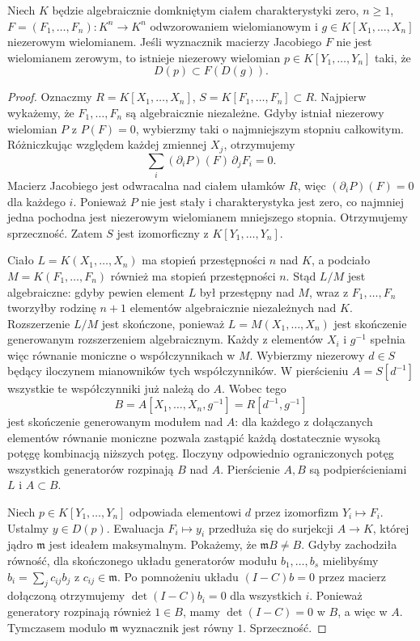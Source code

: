 \begin{lemat}
\label{aa:lem:lie-dominant-image}
Niech $K$ będzie algebraicznie domkniętym ciałem charakterystyki zero, $n\ge1$, $F=(F_1,\ldots,F_n):K^n\to K^n$ odwzorowaniem wielomianowym i $g\in K[X_1,\ldots,X_n]$ niezerowym wielomianem. Jeśli wyznacznik macierzy Jacobiego $F$ nie jest wielomianem zerowym, to istnieje niezerowy wielomian $p\in K[Y_1,\ldots,Y_n]$ taki, że
\[
 D(p)\subset F(D(g)).
\]
\end{lemat}
\begin{proof}
Oznaczmy $R=K[X_1,\ldots,X_n]$, $S=K[F_1,\ldots,F_n]\subset R$. Najpierw wykażemy, że $F_1,\ldots,F_n$ są algebraicznie niezależne. Gdyby istniał niezerowy wielomian $P$ z $P(F)=0$, wybierzmy taki o najmniejszym stopniu całkowitym. Różniczkując względem każdej zmiennej $X_j$, otrzymujemy
\[
 \sum_i (\partial_iP)(F)\,\partial_j F_i=0.
\]
Macierz Jacobiego jest odwracalna nad ciałem ułamków $R$, więc $(\partial_iP)(F)=0$ dla każdego $i$. Ponieważ $P$ nie jest stały i charakterystyka jest zero, co najmniej jedna pochodna jest niezerowym wielomianem mniejszego stopnia. Otrzymujemy sprzeczność. Zatem $S$ jest izomorficzny z $K[Y_1,\ldots,Y_n]$.

Ciało $L=K(X_1,\ldots,X_n)$ ma stopień przestępności $n$ nad $K$, a podciało $M=K(F_1,\ldots,F_n)$ również ma stopień przestępności $n$. Stąd $L/M$ jest algebraiczne: gdyby pewien element $L$ był przestępny nad $M$, wraz z $F_1,\ldots,F_n$ tworzyłby rodzinę $n+1$ elementów algebraicznie niezależnych nad $K$. Rozszerzenie $L/M$ jest skończone, ponieważ $L=M(X_1,\ldots,X_n)$ jest skończenie generowanym rozszerzeniem algebraicznym. Każdy z elementów $X_i$ i $g^{-1}$ spełnia więc równanie moniczne o współczynnikach w $M$. Wybierzmy niezerowy $d\in S$ będący iloczynem mianowników tych współczynników. W pierścieniu $A=S[d^{-1}]$ wszystkie te współczynniki już należą do $A$. Wobec tego
\[
 B=A[X_1,\ldots,X_n,g^{-1}]=R[d^{-1},g^{-1}]
\]
jest skończenie generowanym modułem nad $A$: dla każdego z dołączanych elementów równanie moniczne pozwala zastąpić każdą dostatecznie wysoką potęgę kombinacją niższych potęg. Iloczyny odpowiednio ograniczonych potęg wszystkich generatorów rozpinają $B$ nad $A$. Pierścienie $A,B$ są podpierścieniami $L$ i $A\subset B$.

Niech $p\in K[Y_1,\ldots,Y_n]$ odpowiada elementowi $d$ przez izomorfizm $Y_i\mapsto F_i$. Ustalmy $y\in D(p)$. Ewaluacja $F_i\mapsto y_i$ przedłuża się do surjekcji $A\to K$, której jądro $\mathfrak m$ jest ideałem maksymalnym. Pokażemy, że $\mathfrak mB\ne B$. Gdyby zachodziła równość, dla skończonego układu generatorów modułu $b_1,\ldots,b_s$ mielibyśmy
$b_i=\sum_j c_{ij}b_j$ z $c_{ij}\in\mathfrak m$. Po pomnożeniu układu $(I-C)b=0$ przez macierz dołączoną otrzymujemy $\det(I-C)b_i=0$ dla wszystkich $i$. Ponieważ generatory rozpinają również $1\in B$, mamy $\det(I-C)=0$ w $B$, a więc w $A$. Tymczasem modulo $\mathfrak m$ wyznacznik jest równy $1$. Sprzeczność.


\end{proof}
